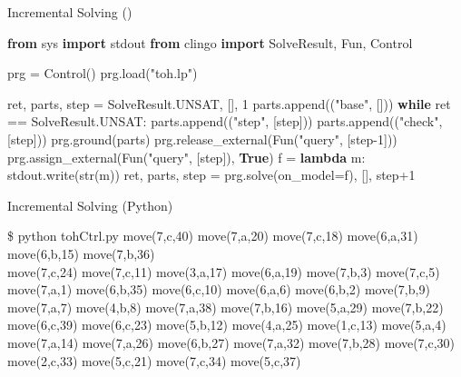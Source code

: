 \begin{frame}[fragile]{Incremental Solving ()}
  \small
  \begin{semiverbatim}
{\bf{}from} sys {\bf{}import} stdout
{\bf{}from} clingo {\bf{}import} SolveResult, Fun, Control

\alert<3>{prg = Control()}
\alert<3>{prg.load("toh.lp")}

ret, parts, step = SolveResult.UNSAT, [], 1
parts.append(("base", []))
{\bf{}while} ret == SolveResult.UNSAT:
    parts.append(("step", [step]))
    parts.append(("check", [step]))
    prg.ground(parts)
    prg.release_external(Fun("query", [step-1]))
    prg.assign_external(Fun("query", [step]), {\bf{}True})
    \alert<4,5>{f = {\bf{}lambda} m: stdout.write(str(m))}
    ret, parts, step = prg.solve(\alert<5>{on_model=f}), [], step+1
  \end{semiverbatim}
\end{frame}
\begin{frame}[fragile]{Incremental Solving (Python)}
\scriptsize
\begin{semiverbatim}
\$ python tohCtrl.py \pause
move(7,c,40) move(7,a,20) move(7,c,18) move(6,a,31) move(6,b,15) move(7,b,36) \\
move(7,c,24) move(7,c,11) move(3,a,17) move(6,a,19) move(7,b,3)  move(7,c,5)  \\
move(7,a,1)  move(6,b,35) move(6,c,10) move(6,a,6)  move(6,b,2)  move(7,b,9)  \\
move(7,a,7)  move(4,b,8)  move(7,a,38) move(7,b,16) move(5,a,29) move(7,b,22) \\
move(6,c,39) move(6,c,23) move(5,b,12) move(4,a,25) move(1,c,13) move(5,a,4)  \\
move(7,a,14) move(7,a,26) move(6,b,27) move(7,a,32) move(7,b,28) move(7,c,30) \\
move(2,c,33) move(5,c,21) move(7,c,34) move(5,c,37)
\end{semiverbatim}
\end{frame}
